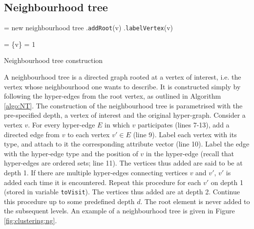 \subsection{Neighbourhood tree}
\label{sec:NT}



\begin{algorithm}[t]
\SetAlgoLined
{}
 \NT = new neighbourhood tree\;
 \NT.\texttt{addRoot}(v)\;
 \NT.\texttt{labelVertex}(v) 

 \Tovisit = \{v\} 
 \D = 1 

 \caption{Neighbourhood tree construction}
 \label{algo:NT}
\end{algorithm}


A neighbourhood tree is a directed graph rooted at a vertex of interest, i.e. the vertex whose neighbourhood one wants to describe.
It is constructed simply by following the hyper-edges from the root vertex, as outlined in Algorithm \ref{algo:NT}.
The construction of the neighbourhood tree is parametrised with the pre-specified depth, a vertex of interest and the original hyper-graph.
Consider a vertex $v$.
For every hyper-edge $E$ in which $v$ participates (lines 7-13), add a directed edge from $v$ to each vertex $v' \in E$ (line 9).
Label each vertex with its type, and attach to it the corresponding attribute vector (line 10).
Label the edge with the hyper-edge type and the position of $v$ in the hyper-edge (recall that hyper-edges are ordered sets; line 11).
The vertices thus added are said to be at depth 1.
If there are multiple hyper-edges connecting vertices $v$ and $v'$, $v'$ is added each time it is encountered.
Repeat this procedure for each $v'$ on depth 1 (stored in variable \texttt{toVisit}).
The vertices thus added are at depth 2.
Continue this procedure up to some predefined depth $d$.
The root element is never added to the subsequent levels.
An example of a neighbourhood tree is given in Figure \ref{fig:clustering:ng}.


